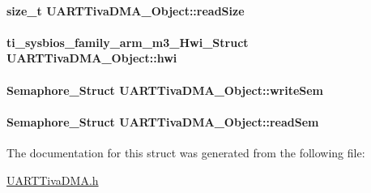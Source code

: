 \paragraph[{read\+Size}]{\setlength{\rightskip}{0pt plus 5cm}size\+\_\+t U\+A\+R\+T\+Tiva\+D\+M\+A\+\_\+\+Object\+::read\+Size}\label{struct_u_a_r_t_tiva_d_m_a___object_ad223d07a1814962421a0968e787449cc}
\paragraph[{hwi}]{\setlength{\rightskip}{0pt plus 5cm}ti\+\_\+sysbios\+\_\+family\+\_\+arm\+\_\+m3\+\_\+\+Hwi\+\_\+\+Struct U\+A\+R\+T\+Tiva\+D\+M\+A\+\_\+\+Object\+::hwi}\label{struct_u_a_r_t_tiva_d_m_a___object_a6d53ea962b0b237a2d53937665733798}
\paragraph[{write\+Sem}]{\setlength{\rightskip}{0pt plus 5cm}Semaphore\+\_\+\+Struct U\+A\+R\+T\+Tiva\+D\+M\+A\+\_\+\+Object\+::write\+Sem}\label{struct_u_a_r_t_tiva_d_m_a___object_aa594694853d811a1e06cc553f90acb2c}
\paragraph[{read\+Sem}]{\setlength{\rightskip}{0pt plus 5cm}Semaphore\+\_\+\+Struct U\+A\+R\+T\+Tiva\+D\+M\+A\+\_\+\+Object\+::read\+Sem}\label{struct_u_a_r_t_tiva_d_m_a___object_a8d92851a2c895c372a500654d7a483a9}


The documentation for this struct was generated from the following file\+:\begin{DoxyCompactItemize}
\item 
\hyperlink{_u_a_r_t_tiva_d_m_a_8h}{U\+A\+R\+T\+Tiva\+D\+M\+A.\+h}\end{DoxyCompactItemize}
